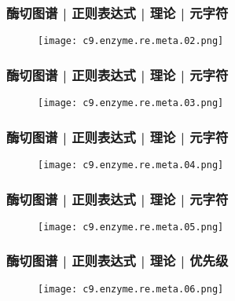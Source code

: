 \begin{frame}
  \frametitle{酶切图谱 | 正则表达式 | 理论 | 元字符}
  \begin{figure}
    \centering
    \texttt{[image: c9.enzyme.re.meta.02.png]}
  \end{figure}
\end{frame}

\begin{frame}
  \frametitle{酶切图谱 | 正则表达式 | 理论 | \alert{元字符}}
  \begin{figure}
    \centering
    \texttt{[image: c9.enzyme.re.meta.03.png]}
  \end{figure}
\end{frame}

\begin{frame}
  \frametitle{酶切图谱 | 正则表达式 | 理论 | \alert{元字符}}
  \begin{figure}
    \centering
    \texttt{[image: c9.enzyme.re.meta.04.png]}
  \end{figure}
\end{frame}

\begin{frame}
  \frametitle{酶切图谱 | 正则表达式 | 理论 | 元字符}
  \begin{figure}
    \centering
    \texttt{[image: c9.enzyme.re.meta.05.png]}
  \end{figure}
\end{frame}

\begin{frame}
  \frametitle{酶切图谱 | 正则表达式 | 理论 | 优先级}
  \begin{figure}
    \centering
    \texttt{[image: c9.enzyme.re.meta.06.png]}
  \end{figure}
\end{frame}

